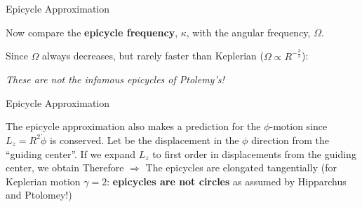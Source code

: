 \documentclass[letterpaper,landscape]{slides}
\begin{document}
\begin{slide}
\begin{center}
{\large \color{red} 
                      Epicycle Approximation   }
\end{center}


Now compare the {\bf epicycle frequency}, $\kappa$, with the angular
frequency, $\Omega$.

Since $\Omega$ always decreases, but rarely faster than Keplerian ($\Omega
\propto R^{-\frac{3}{2}}$):

{\it These are not the infamous epicycles of Ptolemy's!} 
\vfill
\end{slide}



\begin{slide}
\begin{center}
{\large \color{red} 
                      Epicycle Approximation   }
\end{center}

The epicycle approximation also makes a prediction for the
$\phi$-motion since $L_z = R^2 \dot\phi$ is conserved.  Let
be the displacement in the $\phi$ direction from the ``guiding
center''.  If we expand $L_z$ to first order in displacements from the
guiding center, we obtain
Therefore
$\Rightarrow$ The epicycles are elongated tangentially (for Keplerian
motion $\gamma=2$: {\bf epicycles are not circles} as assumed by Hipparchus and 
Ptolomey!) 

\vfill
\end{slide}


\end{document}
